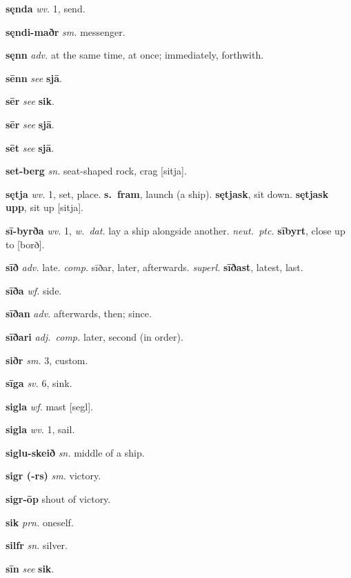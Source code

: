 \documentclass[12pt,letterpaper]{book}
\begin{document}
\noindent
\textbf{sęnda} \textit{wv.} 1, send.

\noindent
\textbf{sęndi-maðr} \textit{sm.} messenger.

\noindent
\textbf{sęnn} \textit{adv.} at the same time, at once; immediately,
	forthwith.

\noindent
\textbf{sēnn} \textit{} \textit{see} \textbf{sjā}.

\noindent
\textbf{sēr} \textit{} \textit{see} \textbf{sik}.

\noindent
\textbf{sēr} \textit{} \textit{see} \textbf{sjā}.

\noindent
\textbf{sēt} \textit{} \textit{see} \textbf{sjā}.

\noindent
\textbf{set-berg} \textit{sn.} seat-shaped rock, crag [sitja].

\noindent
\textbf{sętja} \textit{wv.} 1, set, place.  \textbf{s.\ fram}, launch (a
	ship).  \textbf{sętjask}, sit down.  \textbf{sętjask upp}, sit up
	[sitja].

\noindent
\textbf{sī-byrða} \textit{wv.} 1, \textit{w.\ dat.} lay a ship alongside
	another.  \textit{neut.\ ptc.} \textbf{sībyrt}, close up to [borð].

\noindent
\textbf{sīð} \textit{adv.} late.  \textit{comp.} sīðar, later, afterwards.
	\textit{superl.} \textbf{sīðast}, latest, last.

\noindent
\textbf{sīða} \textit{wf.} side.

\noindent
\textbf{sīðan} \textit{adv.} afterwards, then; since.

\noindent
\textbf{sīðari} \textit{adj.\ comp.} later, second (in order).

\noindent
\textbf{siðr} \textit{sm.} 3, custom.

\noindent
\textbf{sīga} \textit{sv.} 6, sink.

\noindent
\textbf{sigla} \textit{wf.} mast [segl].

\noindent
\textbf{sigla} \textit{wv.} 1, sail.

\noindent
\textbf{siglu-skeið} \textit{sn.} middle of a ship.

\noindent
\textbf{sigr (-rs)} \textit{sm.} victory.

\noindent
\textbf{sigr-ōp} \textit{} shout of victory.

\noindent
\textbf{sik} \textit{prn.} oneself.

\noindent
\textbf{silfr} \textit{sn.} silver.

\noindent
\textbf{sīn} \textit{} \textit{see} \textbf{sik}.
\end{document}
